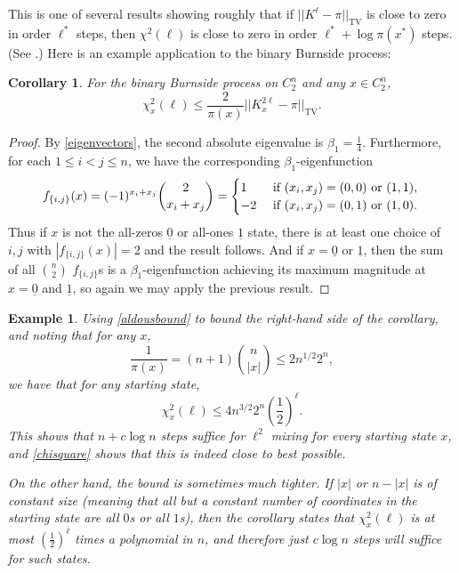 \documentclass[11pt]{article}
\newcounter{r}
\newcounter{s}
\numberwithin{equation}{section}
\newtheorem{corollary}[theorem]{Corollary}
\newtheorem{example}[theorem]{Example}
\begin{document}
This is one of several results showing roughly that if $||K^\ell - \pi||_{\text{TV}}$ is close to zero in order $\ell^\ast$ steps, then $\chi^2(\ell)$ is close to zero in order $\ell^\ast + \log \pi(x^\ast)$ steps. (See \cite[Chapter 12]{levinperes}.) Here is an example application to the binary Burnside process:

\begin{corollary}\label{l2byl1corollary}
For the binary Burnside process on $C_2^n$ and \textit{any} $x \in C_2^n$,
\[
    \chi_x^2(\ell) \le \frac{2}{\pi(x)} ||K_x^{2\ell} - \pi||_{\text{TV}}.
\]
\end{corollary}
\begin{proof}
By \cref{eigenvectors}, the second absolute eigenvalue is $\beta_1 = \frac{1}{4}$. Furthermore, for each $1 \le i < j \le n$, we have the corresponding $\beta_1$-eigenfunction 
\begin{equation}\label{beta1eigenfunction}
    f_{\{i,j\}}(x) = (-1)^{x_i + x_j} \binom{2}{x_i + x_j} = \begin{cases} 1 & \text{ if }(x_i, x_j) = (0, 0) \text{ or }(1, 1), \\ -2 & \text{ if }(x_i, x_j) = (0, 1) \text{ or }(1, 0). \end{cases} \\
\end{equation}
Thus if $x$ is not the all-zeros $\underline{0}$ or all-ones $\underline{1}$ state, there is at least one choice of $i, j$ with $|f_{\{i,j\}}(x)| = 2$ and the result follows. And if $x = \underline{0}$ or $\underline{1}$, then the sum of all $\binom{n}{2}$ $f_{\{i,j\}}$s is a $\beta_1$-eigenfunction achieving its maximum magnitude at $x = \underline{0}$ and $\underline{1}$, so again we may apply the previous result.
\end{proof}

\begin{example}\label{l2byl1example}
Using \cref{aldousbound} to bound the right-hand side of the corollary, and noting that for any $x$, 
\[
    \frac{1}{\pi(x)} = (n+1) \binom{n}{|x|} \le 2n^{1/2} 2^n,
\]  
we have that for any starting state,
\[
    \chi_x^2(\ell) \le 4n^{3/2} 2^n \left(\frac{1}{2}\right)^\ell.
\]
This shows that $n + c \log n$ steps suffice for $\ell^2$ mixing for every starting state $x$, and \cref{chisquare} shows that this is indeed close to best possible. 

On the other hand, the bound is sometimes much tighter. If $|x|$ or $n - |x|$ is of constant size (meaning that all but a constant number of coordinates in the starting state are all $0$s or all $1$s), then the corollary states that $\chi_x^2(\ell)$ is at most $\left(\frac{1}{2}\right)^\ell$ times a polynomial in $n$, and therefore just $c \log n$ steps will suffice for such states.
\end{example}
\end{document}
